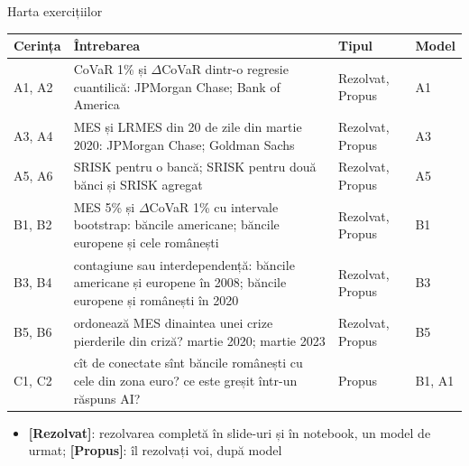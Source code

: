 \begin{frame}{Harta exercițiilor}
\itemsize{\small}
\begin{center}
\footnotesize
\begin{tabular}{>{\raggedright\arraybackslash}p{1.1cm}>{\raggedright\arraybackslash}p{7.5cm}>{\raggedright\arraybackslash}p{1.9cm}>{\raggedright\arraybackslash}p{1.4cm}}
\toprule
\textbf{Cerința} & \textbf{Întrebarea} & \textbf{Tipul} & \textbf{Model} \\
\midrule
A1, A2 & CoVaR 1\% și $\Delta$CoVaR dintr-o regresie cuantilică: JPMorgan Chase; Bank of America & Rezolvat, Propus & A1 \\
A3, A4 & MES și LRMES din 20 de zile din martie 2020: JPMorgan Chase; Goldman Sachs & Rezolvat, Propus & A3 \\
A5, A6 & SRISK pentru o bancă; SRISK pentru două bănci și SRISK agregat & Rezolvat, Propus & A5 \\
B1, B2 & MES 5\% și $\Delta$CoVaR 1\% cu intervale bootstrap: băncile americane; băncile europene și cele românești & Rezolvat, Propus & B1 \\
B3, B4 & contagiune sau interdependență: băncile americane și europene în 2008; băncile europene și românești în 2020 & Rezolvat, Propus & B3 \\
B5, B6 & ordonează MES dinaintea unei crize pierderile din criză? martie 2020; martie 2023 & Rezolvat, Propus & B5 \\
C1, C2 & cît de conectate sînt băncile românești cu cele din zona euro? ce este greșit într-un răspuns AI? & Propus & B1, A1 \\
\bottomrule
\end{tabular}
\end{center}
\begin{itemize}
    \item \textbf{[Rezolvat]}: rezolvarea completă în slide-uri și în notebook, un model de urmat; \textbf{[Propus]}: îl rezolvați voi, după model
\end{itemize}
\end{frame}

